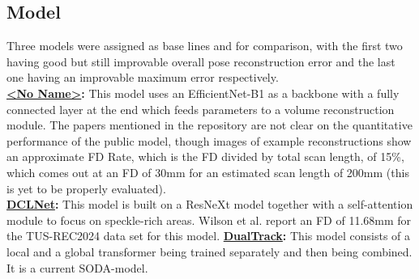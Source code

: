 \documentclass[10.5pt,a4paper]{article}
\begin{document}
\subsection{Model}
Three models were assigned as base lines and for comparison, with the first two having good but still improvable overall pose reconstruction error and the last one having an improvable maximum error respectively.\\
\textbf{\href{https://github.com/ucl-candi/freehand}{<No Name>}:} This model uses an EfficientNet-B1 as a backbone with a fully connected layer at the end which feeds parameters to a volume reconstruction module. The papers mentioned in the repository are not clear on the quantitative performance of the public model, though images of example reconstructions show an approximate FD Rate, which is the FD divided by total scan length, of 15\%, which comes out at an FD of 30mm for an estimated scan length of 200mm (this is yet to be properly evaluated).\\
\textbf{\href{https://github.com/DIAL-RPI/FreehandUSRecon}{DCLNet}:} This model is built on a ResNeXt model together with a self-attention module to focus on speckle-rich areas. Wilson et al. \cite{Wilson.2025} report an FD of 11.68mm for the TUS-REC2024 data set for this model.
\textbf{\href{https://github.com/ImFusionGmbH/DualTrack}{DualTrack}:} This model consists of a local and a global transformer being trained separately and then being combined. It is a current SODA-model.
\end{document}

